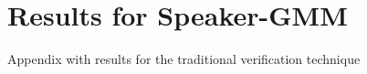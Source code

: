 \chapter{Results for Speaker-GMM}
\label{apx:speaker-gmm-results}

Appendix with results for the traditional verification technique